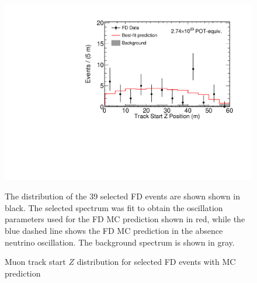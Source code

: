 \begin{figure}
\begin{center}
\includegraphics[width=\textwidth]{figures/results/fd_data_mc_numi_plots/trkStartZ_unblind.pdf}
\end{center}
\caption{ Muon track start $Z$ distribution for selected FD events with MC prediction }{
The distribution of the 39 selected FD events are shown shown in black.
The selected spectrum was fit to obtain the oscillation parameters used
for the FD MC prediction shown in red, while
the blue dashed line shows the FD MC prediction in the absence neutrino
oscillation.
The background spectrum is shown in gray.
}
\label{trkStartZ_unblind}

\end{figure}


